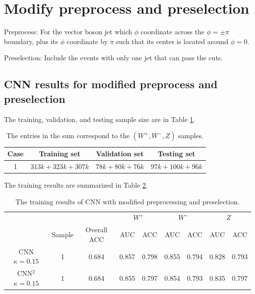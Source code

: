 \documentclass[12pt]{article}
\begin{document}
\section{Modify preprocess and preselection}%
\label{sec:modify_preprocess_and_preselection}
	Preprocess: For the vector boson jet which $\phi$ coordinate across the $\phi = \pm\pi$ boundary, plus its $\phi$ coordinate by  $\pi$ such that its center is located around $\phi = 0$.

	Preselection: Include the events with only one jet that can pass the cuts.

	\subsection{CNN results for modified preprocess and preselection}%
	\label{sub:cnn_results_for_modified_preprocess_and_preselection}
		The training, validation, and testing sample size are in Table \ref{tab:CNN_sample_size_modified}.
		\begin{table}[htpb]
			\centering
			\caption{The entries in the sum correspond to the $(W^{+}, W^{-}, Z)$ samples.}
			\label{tab:CNN_sample_size_modified}
			\begin{tabular}{c|c|c|c}
			Case & Training set     & Validation set & Testing set   \\ \hline
			1    & $313k+323k+307k$ & $78k+80k+76k$  & $97k+100k+96k$ \\
			\end{tabular}
		\end{table}

		The training results are summarized in Table \ref{tab:CNN_training_result_modified}.
		\begin{table}[htpb]
			\centering
			\caption{The training results of CNN with modified preprocessing and preselection.}
			\label{tab:CNN_training_result_modified}
			\begin{tabular}{c|c|c|cc|cc|cc}
								  &					  &             & \multicolumn{2}{c|}{$W^{+}$} & \multicolumn{2}{c|}{$W^{-}$} & \multicolumn{2}{c}{$Z$} \\
								  & Sample			  & Overall ACC & AUC        & ACC       & AUC        & ACC       & AUC       & ACC       \\ \hline
				CNN $\kappa=0.15$ & \multirow{1}{*}{1}& 0.684 & 0.857 & 0.798 & 0.855 & 0.794 & 0.828 & 0.793\\
				CNN${}^2$ $\kappa=0.15$ & \multirow{1}{*}{1}& 0.684 & 0.855 & 0.797 & 0.854 & 0.793 & 0.835 & 0.797\\
			\end{tabular}
		\end{table}	
\end{document}
